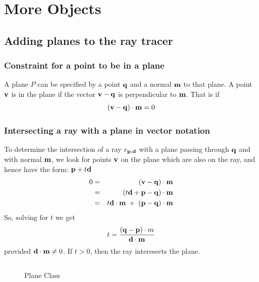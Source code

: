 \documentclass{book}
\newcommand{\vect}[1]{{\bf{ #1}}}
\begin{document}
\chapter{More Objects}

\section{Adding planes to the ray tracer}

\subsection{Constraint for a point to be in a plane}
A plane $P$ can be specified by a point ${\vect q}$ and a normal ${\vect m}$ to that plane.
A point ${\vect v}$ is in the plane if the vector ${\vect v} - {\vect q}$ is perpendicular to ${\vect m}$.
That is if
\[
({\vect v} - {\vect q})\cdot {\vect m} = 0
\]

\subsection{Intersecting a ray with a plane in vector notation}
To determine the intersection of a ray $r_{{\vect p},{\vect d}}$
with a plane passing through ${\vect q}$ and with normal ${\vect m}$, we look for points ${\vect v}$ on the
plane which are also on the ray, and hence have the form: ${\vect p} + t {\vect d}$
\begin{eqnarray*}
0 &=& ({\vect v} - {\vect q}) \cdot {\vect m}\\
 &=& (t {\vect d} + {\vect p} - {\vect q}) \cdot {\vect m}\\
 &=& t {\vect d} \cdot {\vect m} \;+\; ({\vect p} - {\vect q}) \cdot {\vect m} \\
\end{eqnarray*}
So, solving for $t$ we get
\[
t = \frac {({\vect q} - {\vect p})\cdot m} {{\vect d} \cdot {\vect m}}
\]
provided ${\vect d} \cdot {\vect m} \ne 0$.
If $t>0$, then the ray interesects the plane.


\begin{figure}
\begin{verbatim}

\end{verbatim}
\caption{Plane Class \label{fig:PlaneClass}}
\end{figure}
\end{document}
